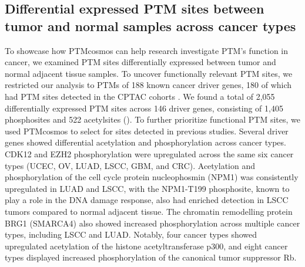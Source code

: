 \subsection{Differential expressed PTM sites between tumor and normal samples across cancer types}
To showcase how PTMcosmos can help research investigate PTM's function in cancer,  we examined PTM sites differentially expressed between tumor and normal adjacent tissue samples. To uncover functionally relevant PTM sites, we restricted our analysis to PTMs of 188 known cancer driver genes, 180 of which had PTM sites detected in the CPTAC cohorts \cite{baileymh_dingl:ComprehensiveCharacterization2018}. We found a total of 2,055 differentially expressed PTM sites across 146 driver genes, consisting of 1,405 phosphosites and 522 acetylsites (). To further prioritize functional PTM sites, we used PTMcosmos to select for sites detected in previous studies. Several driver genes showed differential acetylation and phosphorylation across cancer types. CDK12 and EZH2 phosphorylation were upregulated across the same six cancer types (UCEC, OV, LUAD, LSCC, GBM, and CRC). Acetylation and phosphorylation of the cell cycle protein nucleophosmin (NPM1) was consistently upregulated in LUAD and LSCC, with the NPM1-T199 phosphosite, known to play a role in the DNA damage response, also had enriched detection in LSCC tumors compared to normal adjacent tissue. The chromatin remodelling protein BRG1 (SMARCA4) also showed increased phosphorylation across multiple cancer types, including LSCC and LUAD. Notably, four cancer types showed upregulated acetylation of the histone acetyltransferase p300, and eight cancer types displayed increased phosphorylation of the canonical tumor suppressor Rb.

